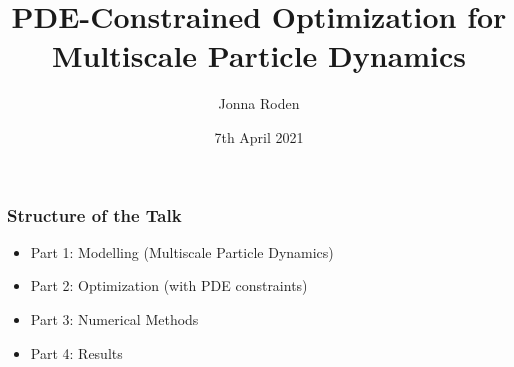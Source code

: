 \documentclass[aspectratio=169,xcolor=dvipsnames]{beamer}
\begin{document}
\title[]{PDE-Constrained Optimization for Multiscale Particle Dynamics}
\author[Jonna Roden]{Jonna Roden}
\date{7th April 2021}

\begin{frame}
\titlepage
\end{frame}
 
 
\begin{frame}
	\frametitle{Structure of the Talk}
	 
	 \begin{itemize}
	 	\item Part 1: Modelling (Multiscale Particle Dynamics)
	 	\item Part 2: Optimization (with PDE constraints)
	 	\item Part 3: Numerical Methods 
	 	\item Part 4: Results
	 \end{itemize}
\end{frame}
\end{document}

